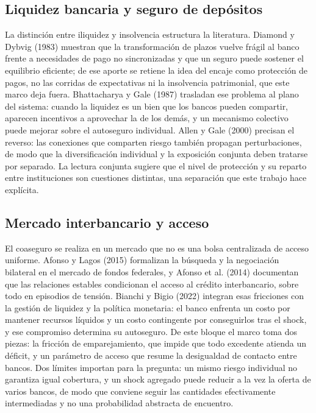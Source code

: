\documentclass[11pt,a4paper]{article}
\begin{document}
\subsection{Liquidez bancaria y seguro de depósitos}
La distinción entre iliquidez y insolvencia estructura la literatura. Diamond y Dybvig (1983) muestran que la transformación de plazos vuelve frágil al banco frente a necesidades de pago no sincronizadas y que un seguro puede sostener el equilibrio eficiente; de ese aporte se retiene la idea del encaje como protección de pagos, no las corridas de expectativas ni la insolvencia patrimonial, que este marco deja fuera. Bhattacharya y Gale (1987) trasladan ese problema al plano del sistema: cuando la liquidez es un bien que los bancos pueden compartir, aparecen incentivos a aprovechar la de los demás, y un mecanismo colectivo puede mejorar sobre el autoseguro individual. Allen y Gale (2000) precisan el reverso: las conexiones que comparten riesgo también propagan perturbaciones, de modo que la diversificación individual y la exposición conjunta deben tratarse por separado. La lectura conjunta sugiere que el nivel de protección y su reparto entre instituciones son cuestiones distintas, una separación que este trabajo hace explícita.

\subsection{Mercado interbancario y acceso}
El coaseguro se realiza en un mercado que no es una bolsa centralizada de acceso uniforme. Afonso y Lagos (2015) formalizan la búsqueda y la negociación bilateral en el mercado de fondos federales, y Afonso et al. (2014) documentan que las relaciones estables condicionan el acceso al crédito interbancario, sobre todo en episodios de tensión. Bianchi y Bigio (2022) integran esas fricciones con la gestión de liquidez y la política monetaria: el banco enfrenta un costo por mantener recursos líquidos y un costo contingente por conseguirlos tras el shock, y ese compromiso determina su autoseguro. De este bloque el marco toma dos piezas: la fricción de emparejamiento, que impide que todo excedente atienda un déficit, y un parámetro de acceso que resume la desigualdad de contacto entre bancos. Dos límites importan para la pregunta: un mismo riesgo individual no garantiza igual cobertura, y un shock agregado puede reducir a la vez la oferta de varios bancos, de modo que conviene seguir las cantidades efectivamente intermediadas y no una probabilidad abstracta de encuentro.
\end{document}
